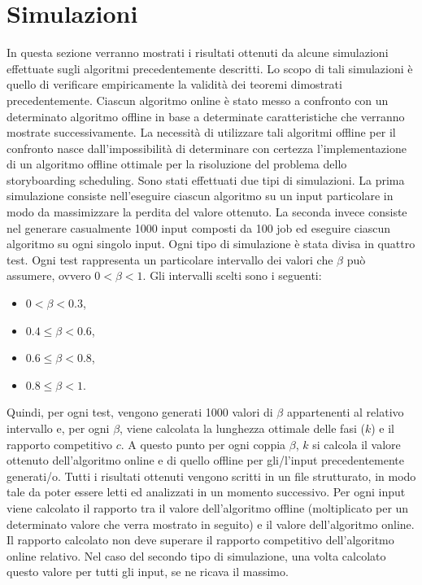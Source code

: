 \documentclass[12pt]{article}
\begin{document}
\section{Simulazioni}
In questa sezione verranno mostrati i risultati ottenuti da alcune simulazioni effettuate sugli algoritmi precedentemente descritti. Lo scopo di tali simulazioni è quello di verificare empiricamente la validità dei teoremi dimostrati precedentemente. Ciascun algoritmo online è stato messo a confronto con un determinato algoritmo offline in base a determinate caratteristiche che verranno mostrate successivamente. La necessità di utilizzare tali algoritmi offline per il confronto nasce dall’impossibilità di determinare con certezza l’implementazione di un algoritmo offline ottimale per la risoluzione del problema dello storyboarding scheduling. Sono stati effettuati due tipi di simulazioni. La prima simulazione consiste nell'eseguire ciascun algoritmo su un input particolare in modo da massimizzare la perdita del valore ottenuto. La seconda invece consiste nel generare casualmente 1000 input composti da 100 job ed eseguire ciascun algoritmo su ogni singolo input. Ogni tipo di simulazione è stata divisa in quattro test. Ogni test rappresenta un particolare intervallo dei valori che $\beta$ può assumere, ovvero $0 < \beta < 1$. Gli intervalli scelti sono i seguenti:
\begin{itemize}
\item{$0 < \beta < 0.3$,}
\item{$0.4 \leq \beta < 0.6$,}
\item{$0.6 \leq \beta < 0.8$,}
\item{$0.8 \leq \beta < 1$.}
\end{itemize}
Quindi, per ogni test, vengono generati 1000 valori di $\beta$ appartenenti al relativo intervallo e, per ogni $\beta$, viene calcolata la lunghezza ottimale delle fasi ($k$) e il rapporto competitivo $c$. A questo punto per ogni coppia $\beta$, $k$ si calcola il valore ottenuto dell'algoritmo online e di quello offline per gli/l'input precedentemente generati/o. Tutti i risultati ottenuti vengono scritti in un file strutturato, in modo tale da poter essere letti ed analizzati in un momento successivo. Per ogni input viene calcolato il rapporto tra il valore dell'algoritmo offline (moltiplicato per un determinato valore che verra mostrato in seguito) e il valore dell'algoritmo online. Il rapporto calcolato non deve superare il rapporto competitivo dell'algoritmo online relativo. Nel caso del secondo tipo di simulazione, una volta calcolato questo valore per tutti gli input, se ne ricava il massimo. 
\end{document}
